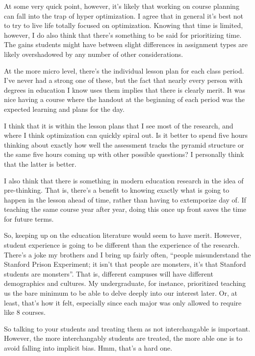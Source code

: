 \documentclass[12pt]{article}
\newcommand{\say}[1]{``#1''}
\renewcommand{\,}{\textsuperscript{,}}
\begin{document}
At some very quick point, however, it's likely that working on course planning can fall into the trap of hyper optimization.
I agree that in general it's best not to try to live life totally focused on optimization.
Knowing that time is limited, however, I do also think that there's something to be said for prioritizing time.
The gains students might have between slight differences in assignment types are likely overshadowed by any number of other considerations.

At the more micro level, there's the individual lesson plan for each class period.
I've never had a strong one of these, but the fact that nearly every person with degrees in education I know uses them implies that there is clearly merit.
It was nice having a course where the handout at the beginning of each period was the expected learning and plans for the day.

I think that it is within the lesson plans that I see most of the research, and where I think optimization can quickly spiral out.
Is it better to spend five hours thinking about exactly how well the assessment tracks the pyramid structure or the same five hours coming up with other possible questions?
I personally think that the latter is better.

I also think that there is something in modern education research in the idea of pre-thinking.
That is, there's a benefit to knowing exactly what is going to happen in the lesson ahead of time, rather than having to extemporize day of.
If teaching the same course year after year, doing this once up front saves the time for future terms.

So, keeping up on the education literature would seem to have merit.
However, student experience is going to be different than the experience of the research.
There's a joke my brothers and I bring up fairly often, \say{people misunderstand the Stanford Prison Experiment; it isn't that people are monsters, it's that Stanford students are monsters}.
That is, different campuses will have different demographics and cultures.
My undergraduate, for instance, prioritized teaching us the bare minimum to be able to delve deeply into our interest later.
Or, at least, that's how it felt, especially since each major was only allowed to require like 8 courses.

So talking to your students and treating them as not interchangable is important.
However, the more interchangably students are treated, the more able one is to avoid falling into implicit bias.
Hmm, that's a hard one.
\end{document}

